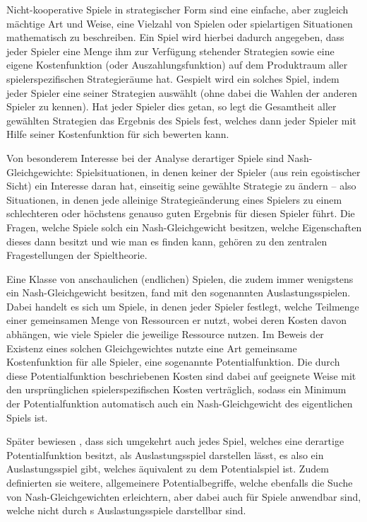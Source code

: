 \documentclass[a4paper,ngerman,11pt,bibliography=totoc]{scrartcl}
\theoremstyle{definition}
\theoremstyle{plain}
\theoremstyle{remark}
\begin{document}
Nicht-kooperative Spiele in strategischer Form sind eine einfache, aber zugleich mächtige Art und Weise, eine Vielzahl von Spielen oder spielartigen Situationen mathematisch zu beschreiben. Ein Spiel wird hierbei dadurch angegeben, dass jeder Spieler eine Menge ihm zur Verfügung stehender Strategien sowie eine eigene Kostenfunktion (oder Auszahlungsfunktion) auf dem Produktraum aller spielerspezifischen Strategieräume hat. \glqq Gespielt\grqq{} wird ein solches Spiel, indem jeder Spieler eine seiner Strategien auswählt (ohne dabei die Wahlen der anderen Spieler zu kennen). Hat jeder Spieler dies getan, so legt die Gesamtheit aller gewählten Strategien das Ergebnis des Spiels fest, welches dann jeder Spieler mit Hilfe seiner Kostenfunktion für sich bewerten kann.

Von besonderem Interesse bei der Analyse derartiger Spiele sind Nash-Gleichgewichte: Spielsituationen, in denen keiner der Spieler (aus rein egoistischer Sicht) ein Interesse daran hat, einseitig seine gewählte Strategie zu ändern -- also Situationen, in denen jede alleinige Strategieänderung eines Spielers zu einem schlechteren oder höchstens genauso guten Ergebnis für diesen Spieler führt. Die Fragen, welche Spiele solch ein Nash-Gleichgewicht besitzen, welche Eigenschaften dieses dann besitzt und wie man es finden kann, gehören zu den zentralen Fragestellungen der Spieltheorie.

Eine Klasse von anschaulichen (endlichen) Spielen, die zudem immer wenigstens ein Nash-Gleichgewicht besitzen, fand \citeauthor{RosenthalPotential} mit den sogenannten Auslastungsspielen. Dabei handelt es sich um Spiele, in denen jeder Spieler festlegt, welche Teilmenge einer gemeinsamen Menge von Ressourcen er nutzt, wobei deren Kosten davon abhängen, wie viele Spieler die jeweilige Ressource nutzen. Im Beweis der Existenz eines solchen Gleichgewichtes nutzte \citeauthor{RosenthalPotential} eine Art gemeinsame Kostenfunktion für alle Spieler, eine sogenannte Potentialfunktion. Die durch diese Potentialfunktion beschriebenen Kosten sind dabei auf geeignete Weise mit den ursprünglichen spielerspezifischen Kosten verträglich, sodass ein Minimum der Potentialfunktion automatisch auch ein Nash-Gleichgewicht des eigentlichen Spiels ist.

Später bewiesen \citeauthor{MonShap}, dass sich umgekehrt auch jedes Spiel, welches eine derartige Potentialfunktion besitzt, als Auslastungsspiel darstellen lässt, es also ein Auslastungsspiel gibt, welches äquivalent zu dem Potentialspiel ist. Zudem definierten sie weitere, allgemeinere Potentialbegriffe, welche ebenfalls die Suche von Nash-Gleichgewichten erleichtern, aber dabei auch für Spiele anwendbar sind, welche nicht durch \citeauthor{RosenthalPotential}s Auslastungsspiele darstellbar sind. 
\end{document}
